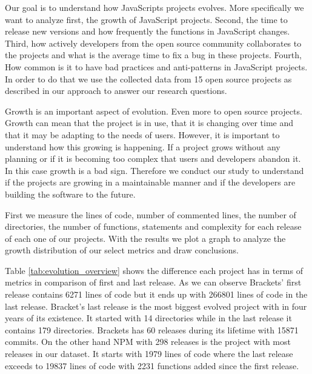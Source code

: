 Our goal is to understand how JavaScripts projects evolves. More specifically we want to analyze first, the growth of JavaScript projects. Second, the time to release new versions and how frequently the functions in JavaScript changes. Third, how actively developers from the open source community collaborates to the projects and what is the average time to fix a bug in these projects. Fourth, How common is it to have bad practices and anti-patterns in JavaScript projects. In order to do that we use the collected data from 15 open source projects as described in our approach to answer our research questions. 

\vspace{5 mm}
\noindent{\rqi}
\vspace{5 mm}

 Growth is an important aspect of evolution. Even more to open source projects. Growth can mean that the project is in use, that it is changing over time and that it may be adapting to the needs of users. However, it is important to understand how this growing is happening. If a project grows without any planning or if it is becoming too complex that users and developers abandon it. In this case growth is a bad sign. Therefore we conduct our study to understand if the projects are growing in a maintainable manner and if the developers are building the software to the future.   

\vspace{2 mm}
 First we measure the lines of code, number of commented lines, the number of directories, the number of functions, statements and complexity for each release of each one of our projects. With the results we plot a graph to analyze the growth distribution of our select metrics and draw conclusions. 

\vspace{2 mm}
 Table \ref{tab:evolution_overview} shows the difference each project has in terms of metrics in comparison of first and last release.
As we can observe Brackets' first release contains 6271 lines of code but it ends up with 266801 lines of code in the last release. Bracket's last release is the most biggest evolved project with in four years of its existence. It started with 14 directories while in the last release it contains 179 directories. Brackets has 60 releases during its lifetime with 15871 commits. On the other hand NPM with 298 releases is the project with most releases in our dataset. It starts with 1979 lines of code where the last release exceeds to 19837 lines of code with 2231 functions added since the first release.

